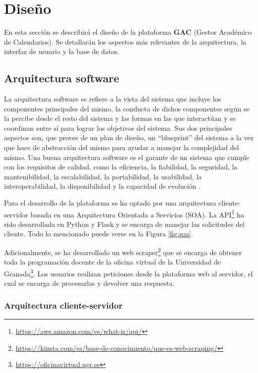 \chapter{Diseño}
En esta sección se describirá el diseño de la plataforma \textbf{GAC} (Gestor Académico de Calendarios). Se detallarán los aspectos más relevantes de la arquitectura, la interfaz de usuario y la base de datos.



\section{Arquitectura software}
La arquitectura software se refiere a la vista del sistema que incluye los componentes principales del mismo, la conducta de dichos componentes según se la percibe desde el resto del sistema y las formas en las que interactúan y se coordinan entre sí para lograr los objetivos del sistema. Sus dos principales aspectos son, que provee de un plan de diseño, un ``blueprint'' del sistema a la vez que hace de abstracción del mismo para ayudar a manejar la complejidad del mismo. Una buena arquitectura software es el garante de un sistema que cumple con los requisitos de calidad, como la eficiencia, la fiabilidad, la seguridad, la mantenibilidad, la escalabilidad, la portabilidad, la usabilidad, la interoperabilidad, la disponibilidad y la capacidad de evolución \cite{hofmeister2000applied, reynoso2004introduccion, garlan2008software}.\newline

Para el desarrollo de la plataforma se ha optado por una arquitectura cliente-servidor basada en una Arquitectura Orientada a Servicios (SOA). La API\footnote{\url{https://aws.amazon.com/es/what-is/api/}} ha sido desarrollada en Python y Flask y se encarga de manejar las solicitudes del cliente. Todo lo mencionado puede verse en la Figura \ref{fig:soa}.\newline

\newpage

Adicionalmente, se ha desarrollado un web scraper\footnote{\url{https://kinsta.com/es/base-de-conocimiento/que-es-web-scraping/}} que se encarga de obtener toda la programación docente de la oficina virtual de la Universidad de Granada\footnote{\url{https://oficinavirtual.ugr.es}}. Los usuarios realizan peticiones desde la plataforma web al servidor, el cual se encarga de procesarlas y devolver una respuesta.\newline


\subsection{Arquitectura cliente-servidor}

